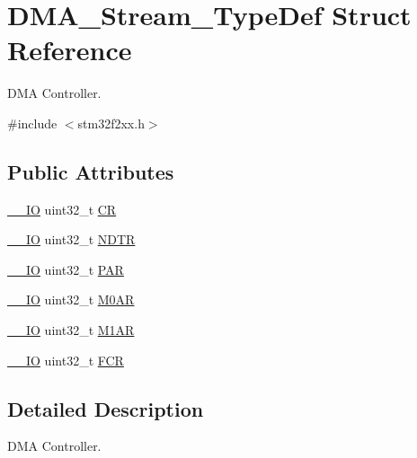 \hypertarget{struct_d_m_a___stream___type_def}{\section{D\-M\-A\-\_\-\-Stream\-\_\-\-Type\-Def Struct Reference}
\label{struct_d_m_a___stream___type_def}
}


D\-M\-A Controller.  




{\ttfamily \#include $<$stm32f2xx.\-h$>$}

\subsection*{Public Attributes}
\begin{DoxyCompactItemize}
\item 
\hyperlink{group___c_m_s_i_s__core__definitions_gaec43007d9998a0a0e01faede4133d6be}{\-\_\-\-\_\-\-I\-O} uint32\-\_\-t \hyperlink{struct_d_m_a___stream___type_def_af893adc5e821b15d813237b2bfe4378b}{C\-R}
\item 
\hyperlink{group___c_m_s_i_s__core__definitions_gaec43007d9998a0a0e01faede4133d6be}{\-\_\-\-\_\-\-I\-O} uint32\-\_\-t \hyperlink{struct_d_m_a___stream___type_def_a2cc2a52628182f9e79ab1e49bb78a1eb}{N\-D\-T\-R}
\item 
\hyperlink{group___c_m_s_i_s__core__definitions_gaec43007d9998a0a0e01faede4133d6be}{\-\_\-\-\_\-\-I\-O} uint32\-\_\-t \hyperlink{struct_d_m_a___stream___type_def_adbeac1d47cb85ab52dac71d520273947}{P\-A\-R}
\item 
\hyperlink{group___c_m_s_i_s__core__definitions_gaec43007d9998a0a0e01faede4133d6be}{\-\_\-\-\_\-\-I\-O} uint32\-\_\-t \hyperlink{struct_d_m_a___stream___type_def_a965da718db7d0303bff185d367d96fd6}{M0\-A\-R}
\item 
\hyperlink{group___c_m_s_i_s__core__definitions_gaec43007d9998a0a0e01faede4133d6be}{\-\_\-\-\_\-\-I\-O} uint32\-\_\-t \hyperlink{struct_d_m_a___stream___type_def_a142ca5a1145ba9cf4cfa557655af1c13}{M1\-A\-R}
\item 
\hyperlink{group___c_m_s_i_s__core__definitions_gaec43007d9998a0a0e01faede4133d6be}{\-\_\-\-\_\-\-I\-O} uint32\-\_\-t \hyperlink{struct_d_m_a___stream___type_def_aad3d78ab35e7af48951be5be53392f9f}{F\-C\-R}
\end{DoxyCompactItemize}


\subsection{Detailed Description}
D\-M\-A Controller. 

